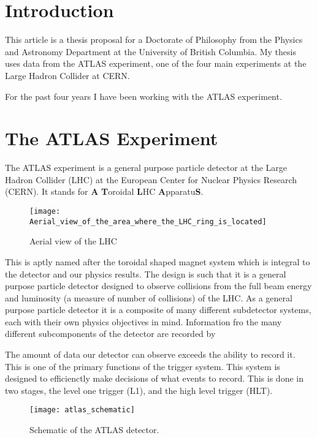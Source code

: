 \documentclass[12pt]{article}
\begin{document}

\newpage

\newpage
\section{Introduction}
This article is a thesis proposal for a Doctorate of Philosophy from the
Physics and Astronomy Department at the University of British Columbia. My
thesis uses data from the ATLAS experiment, one of the four main experiments at
the Large
Hadron Collider at CERN.

For the past four years I have been working with the ATLAS experiment.


\section{The ATLAS Experiment}
The ATLAS experiment is a general purpose particle detector at the Large Hadron
Collider (LHC) at the European Center for Nuclear Physics Research (CERN). It
stands for \textbf{A} \textbf{T}oroidal \textbf{L}HC
\textbf{A}pparatu\textbf{S}.
\begin{wrapfigure}{l}{0.5\textwidth}
    \centering
    \texttt{[image: Aerial\_view\_of\_the\_area\_where\_the\_LHC\_ring\_is\_located]}
    \caption{Aerial view of the LHC}
    \label{fig:aerial_view}
\end{wrapfigure}
This is aptly named after the toroidal shaped magnet system which is integral to
the detector and our physics results. The design is such that it is a general
purpose particle detector designed to observe collisions from the full beam
energy and luminosity (a measure of number of collisions) of the LHC. As a
general purpose particle detector it is a composite of many different
subdetector systems, each with their own physics objectives in mind. Information
fro the many different subcomponents of the detector are recorded by

The amount of data our detector can observe exceeds the ability to record it.
This is one of the primary functions of the trigger system. This system is
designed to efficienctly make decisions of what events to record. This is done
in two stages, the level one trigger (L1), and the high level trigger (HLT).
\begin{wrapfigure}{r}{0.5\textwidth}
    \centering
    \texttt{[image: atlas\_schematic]}
    \caption{Schematic of the ATLAS detector.}
    \label{fig:atlas_schematic}
\end{wrapfigure}
\end{document}
